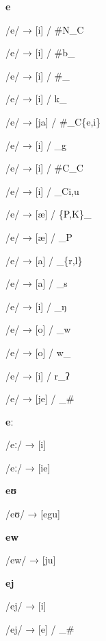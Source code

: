 \begin{center}\textbf{e}\end{center}
\begin{multicols}{4}
\noindent /e/ → [i] / \#N\_C

\noindent /e/ → [i] / \#b\_

\noindent /e/ → [i] / \#\_

\noindent /e/ → [i] / k\_

\noindent /e/ → [ja] / \#\_C\{e,i\}

\noindent /e/ → [i] / \_g

\noindent /e/ → [i] / \#C\_C

\noindent /e/ → [i] / \_C{i,u}

\noindent /e/ → [æ] / \{P,K\}\_

\noindent /e/ → [æ] / \_P

\noindent /e/ → [a] / \_\{r,l\}

\noindent /e/ → [a] / \_s

\noindent /e/ → [i] / \_ŋ

\noindent /e/ → [o] / \_w

\noindent /e/ → [o] / w\_

\noindent /e/ → [i] / r\_ʔ

\noindent /e/ → [je] / \_\#
\end{multicols}


\begin{center}\textbf{eː}\end{center}
\begin{multicols}{4}
\noindent /eː/ → [i]

\noindent /eː/ → [ie]

\end{multicols}

\begin{center}\textbf{eʊ}\end{center}
\begin{multicols}{4}
\noindent /eʊ/ → [egu]
\end{multicols}


\begin{center}\textbf{ew}\end{center}
\begin{multicols}{4}
\noindent /ew/ → [ju]
\end{multicols}


\begin{center}\textbf{ej}\end{center}
\begin{multicols}{4}
\noindent /ej/ → [i]

\noindent /ej/ → [e] / \_\#
\end{multicols}


